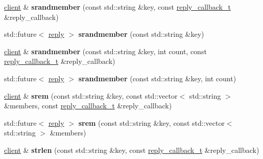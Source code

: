 \begin{DoxyCompactItemize}
\item 
\mbox{\label{classcpp__redis_1_1client_a69e771fb9562fca08cbf653f8ecb295b}} 
\hyperlink{classcpp__redis_1_1client}{client} \& {\bfseries srandmember} (const std\+::string \&key, const \hyperlink{classcpp__redis_1_1client_a061a1140d36d2eaeda82b09a0bb3f9f2}{reply\+\_\+callback\+\_\+t} \&reply\+\_\+callback)
\item 
\mbox{\label{classcpp__redis_1_1client_a2a110009cac1bb5063d468df91802395}} 
std\+::future$<$ \hyperlink{classcpp__redis_1_1reply}{reply} $>$ {\bfseries srandmember} (const std\+::string \&key)
\item 
\mbox{\label{classcpp__redis_1_1client_a59e0a8886b5f4fa177e93053b9965827}} 
\hyperlink{classcpp__redis_1_1client}{client} \& {\bfseries srandmember} (const std\+::string \&key, int count, const \hyperlink{classcpp__redis_1_1client_a061a1140d36d2eaeda82b09a0bb3f9f2}{reply\+\_\+callback\+\_\+t} \&reply\+\_\+callback)
\item 
\mbox{\label{classcpp__redis_1_1client_a23913f257f58864d865d70bfe462caa4}} 
std\+::future$<$ \hyperlink{classcpp__redis_1_1reply}{reply} $>$ {\bfseries srandmember} (const std\+::string \&key, int count)
\item 
\mbox{\label{classcpp__redis_1_1client_a020849a43f10f56941ef98716440d817}} 
\hyperlink{classcpp__redis_1_1client}{client} \& {\bfseries srem} (const std\+::string \&key, const std\+::vector$<$ std\+::string $>$ \&members, const \hyperlink{classcpp__redis_1_1client_a061a1140d36d2eaeda82b09a0bb3f9f2}{reply\+\_\+callback\+\_\+t} \&reply\+\_\+callback)
\item 
\mbox{\label{classcpp__redis_1_1client_a542bc98a1968e22dfce3cd7051680b6f}} 
std\+::future$<$ \hyperlink{classcpp__redis_1_1reply}{reply} $>$ {\bfseries srem} (const std\+::string \&key, const std\+::vector$<$ std\+::string $>$ \&members)
\item 
\mbox{\label{classcpp__redis_1_1client_ab7dab44434cee5e29e2bdf3c3be1df94}} 
\hyperlink{classcpp__redis_1_1client}{client} \& {\bfseries strlen} (const std\+::string \&key, const \hyperlink{classcpp__redis_1_1client_a061a1140d36d2eaeda82b09a0bb3f9f2}{reply\+\_\+callback\+\_\+t} \&reply\+\_\+callback)

\end{DoxyCompactItemize}
